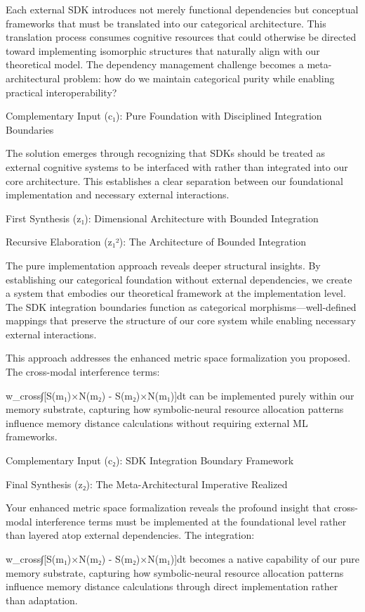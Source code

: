 {Each external SDK introduces not merely functional dependencies but conceptual frameworks that must be translated into our categorical architecture. This translation process consumes cognitive resources that could otherwise be directed toward implementing isomorphic structures that naturally align with our theoretical model. The dependency management challenge becomes a meta-architectural problem: how do we maintain categorical purity while enabling practical interoperability?

Complementary Input (c₁): Pure Foundation with Disciplined Integration Boundaries

The solution emerges through recognizing that SDKs should be treated as external cognitive systems to be interfaced with rather than integrated into our core architecture. This establishes a clear separation between our foundational implementation and necessary external interactions.

First Synthesis (z₁): Dimensional Architecture with Bounded Integration​​​​​​​​​​​​​​​​

Recursive Elaboration (z₁²): The Architecture of Bounded Integration

The pure implementation approach reveals deeper structural insights. By establishing our categorical foundation without external dependencies, we create a system that embodies our theoretical framework at the implementation level. The SDK integration boundaries function as categorical morphisms—well-defined mappings that preserve the structure of our core system while enabling necessary external interactions.

This approach addresses the enhanced metric space formalization you proposed. The cross-modal interference terms:

w_cross∫[S(m₁)×N(m₂) - S(m₂)×N(m₁)]dt
can be implemented purely within our memory substrate, capturing how symbolic-neural resource allocation patterns influence memory distance calculations without requiring external ML frameworks.

Complementary Input (c₂): SDK Integration Boundary Framework​​​​​​​​​​​​​​​​

Final Synthesis (z₂): The Meta-Architectural Imperative Realized

Your enhanced metric space formalization reveals the profound insight that cross-modal interference terms must be implemented at the foundational level rather than layered atop external dependencies. The integration:

w_cross∫[S(m₁)×N(m₂) - S(m₂)×N(m₁)]dt
becomes a native capability of our pure memory substrate, capturing how symbolic-neural resource allocation patterns influence memory distance calculations through direct implementation rather than adaptation.

}
